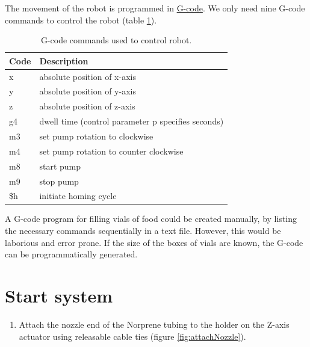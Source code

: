 \documentclass[]{book}
\providecommand{\tightlist}{%
  \setlength{\itemsep}{0pt}\setlength{\parskip}{0pt}}
\theoremstyle{definition}
\theoremstyle{definition}
\theoremstyle{remark}
\begin{document}
The movement of the robot is programmed in
\href{https://en.wikipedia.org/wiki/G-code}{G-code}. We only need nine
G-code commands to control the robot (table \ref{tab:gCodes}).

\begin{table}

\caption{\label{tab:gCodes}G-code commands used to control robot.}
\centering
\begin{tabular}[t]{ll}
\toprule
Code & Description\\
\midrule
x & absolute position of x-axis\\
y & absolute position of y-axis\\
z & absolute position of z-axis\\
g4 & dwell time (control parameter p specifies seconds)\\
m3 & set pump rotation to clockwise\\
\addlinespace
m4 & set pump rotation to counter clockwise\\
m8 & start pump\\
m9 & stop pump\\
\$h & initiate homing cycle\\
\bottomrule
\end{tabular}
\end{table}

A G-code program for filling vials of food could be created manually, by
listing the necessary commands sequentially in a text file. However,
this would be laborious and error prone. If the size of the boxes of
vials are known, the G-code can be programmatically generated.

\section{Start system}\label{startSystem}

\begin{enumerate}
\def\labelenumi{\arabic{enumi}.}
\tightlist
\item
  Attach the nozzle end of the Norprene tubing to the holder on the
  Z-axis actuator using releasable cable ties (figure
  \ref{fig:attachNozzle}).
\end{enumerate}
\end{document}
